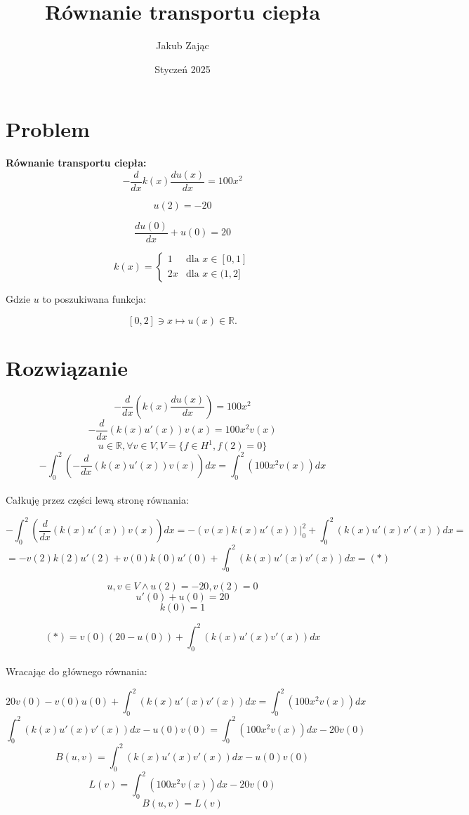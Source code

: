 \documentclass{article}
\title{Równanie transportu ciepła}
\author{Jakub Zając}
\date{Styczeń 2025}
\begin{document}
\maketitle

\section{Problem}
\textbf{Równanie transportu ciepła: }
\[-\frac{d}{dx}k(x)\frac{du(x)}{dx}=100x^2\]

\[u(2) = -20\]

\[\frac{du(0)}{dx} + u(0) = 20\]

\[k(x) =\begin{cases}1 & \text{dla } x \in [0, 1] \\
2x & \text{dla } x \in (1, 2]
\end{cases}\]

Gdzie \( u \) to poszukiwana funkcja:

\[[0, 2] \ni x \mapsto u(x) \in \mathbb{R}.\]

\section{Rozwiązanie}
\[-\frac{d}{dx}(k(x)\frac{du(x)}{dx})=100x^2\]
\[-\frac{d}{dx}(k(x)u'(x))v(x)=100x^2v(x)\]
\[u \in \mathbb{R}, \forall v \in V, V=\{f \in H^1, f(2)=0\}\]
\[-\int_0^2(-\frac{d}{dx}(k(x)u'(x))v(x))dx=\int_0^2(100x^2v(x))dx\]
\\
Całkuję przez części lewą stronę równania:

    \[-\int_0^2 \left( \frac{d}{dx}(k(x)u'(x))v(x) \right)dx = 
    -(v(x)k(x)u'(x))|_0^2 + \int_0^2(k(x)u'(x)v'(x))dx = \]
    \[=-v(2)k(2)u'(2) + v(0)k(0)u'(0) + \int_0^2(k(x)u'(x)v'(x))dx = (*)\]

    \[u, v \in V \land u(2)=-20, v(2)=0\]
    \[u'(0)+u(0)=20\]
    \[k(0)=1\]

    \[(*)=v(0)(20-u(0))+\int_0^2(k(x)u'(x)v'(x))dx\]
\\
Wracając do głównego równania:

\[20v(0)-v(0)u(0)+\int_0^2(k(x)u'(x)v'(x))dx=\int_0^2(100x^2v(x))dx\]
\[\int_0^2(k(x)u'(x)v'(x))dx-u(0)v(0)=\int_0^2(100x^2v(x))dx-20v(0)\]
\[B(u,v)=\int_0^2(k(x)u'(x)v'(x))dx-u(0)v(0)\]
\[L(v)=\int_0^2(100x^2v(x))dx-20v(0)\]
\[B(u,v)=L(v)\]
\end{document}
